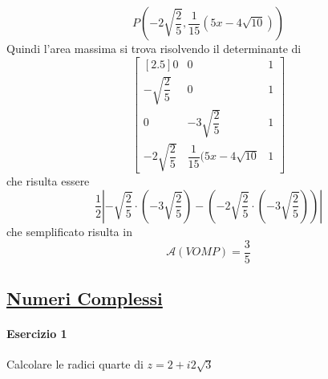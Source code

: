 \begin{equation*}
  P\left(-2\sqrt{\frac{2}{5}},\frac{1}{15}(5x-4\sqrt{10})\right)
\end{equation*}
Quindi l'area massima si trova risolvendo il determinante di
\begin{equation*}
  \begin{bmatrix}[2.5]
    0&0&1\\
    -\sqrt{\dfrac{2}{5}}&0&1\\
    0&-3\sqrt{\dfrac{2}{5}}&1\\
    -2\sqrt{\dfrac{2}{5}}&\dfrac{1}{15}(5x-4\sqrt{10}&1
  \end{bmatrix}
\end{equation*}
che risulta essere
\begin{equation*}
  \frac{1}{2}\left\lvert-\sqrt{\frac{2}{5}}\cdot\left(-3\sqrt{\frac{2}{5}}\right) -
  \left(-2\sqrt{\frac{2}{5}}\cdot\left(-3\sqrt{\frac{2}{5}}\right)\right)\right\rvert
\end{equation*}
che semplificato risulta in
\begin{equation*}
  \boxed{\mathscr{A}(VOMP) = \frac{3}{5}}
\end{equation*}

\subsection*{\hyperref[sec:complex]{Numeri Complessi}}\label{ex:complex}
\paragraph{Esercizio 1}
Calcolare le radici quarte di $z=2+i2\sqrt{3}$
\divisor

